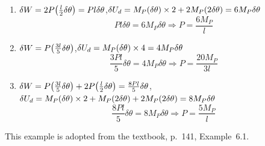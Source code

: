 \begin{example}
\leavevmode
\begin{fig}
  
\end{fig}
\begin{enumerate}[label=\alph*.,start=2,leftmargin=*]
  \item $\delta W = 2P\bigl(\frac l2\delta\theta\bigr) = Pl\delta\theta$,\quad $\delta U_d = M_P(\delta\theta)\times2 + 2M_P(2\delta\theta) = 6M_P\delta\theta$
    \begin{equation*}
      Pl\delta\theta = 6M_P\delta\theta \Rightarrow P = \frac{6M_P}{l}
    \end{equation*}
  \item $\delta W = P\bigl(\frac{3l}{5}\delta\theta\bigr)$,\quad $\delta U_d = M_P(\delta\theta)\times4 = 4M_P\delta\theta$
    \begin{equation*}
      \frac{3Pl}{5}\delta\theta = 4M_P\delta\theta \Rightarrow P = \frac{20M_P}{3l}
    \end{equation*}
  \item $\delta W = P\bigl(\frac{3l}{5}\delta\theta\bigr) + 2P\bigl(\frac l2\delta\theta\bigr) = \frac{8Pl}{5}\delta\theta$,\quad $\delta U_d = M_P(\delta\theta)\times2 + M_P(2\delta\theta) + 2M_P(2\delta\theta) = 8M_P\delta\theta$
    \begin{equation*}
      \frac{8Pl}{5}\delta\theta = 8M_P\delta\theta \Rightarrow P = \frac{5M_P}{l}
    \end{equation*}
\end{enumerate}
\end{example}

\begin{example}[Truss]
This example is adopted from the textbook, p.~141, Example~6.1.
\end{example}

